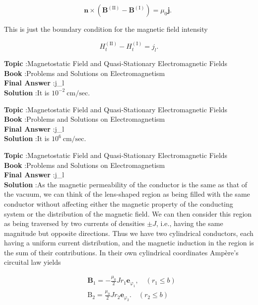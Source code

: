 \documentclass[10pt]{article}
\begin{document}
$$
\mathbf{n} \times\left(\mathbf{B}^{(\mathrm{II})}-\mathbf{B}^{(\mathrm{I})}\right)=\mu_{0} \mathbf{j} \text {. }
$$

This is just the boundary condition for the magnetic field intensity

$$
H_{t}^{(\mathrm{II})}-H_{t}^{(\mathrm{I})}=j_{l} .
$$

\textbf{Topic} :Magnetostatic Field and Quasi-Stationary Electromagnetic Fields\\
\textbf{Book} :Problems and Solutions on Electromagnetism\\
\textbf{Final Answer} :j_{l}\\


\textbf{Solution} :It is $10^{-2} \mathrm{~cm} / \mathrm{sec}$.

\textbf{Topic} :Magnetostatic Field and Quasi-Stationary Electromagnetic Fields\\
\textbf{Book} :Problems and Solutions on Electromagnetism\\
\textbf{Final Answer} :j_{l}\\


\textbf{Solution} :It is $10^{6} \mathrm{~cm} / \mathrm{sec}$.

\textbf{Topic} :Magnetostatic Field and Quasi-Stationary Electromagnetic Fields\\
\textbf{Book} :Problems and Solutions on Electromagnetism\\
\textbf{Final Answer} :j_{l}\\


\textbf{Solution} :As the magnetic permeability of the conductor is the same as that of the vacuum, we can think of the lens-shaped region as being filled with the same conductor without affecting either the magnetic property of the conducting system or the distribution of the magnetic field. We can then consider this region as being traversed by two currents of densities $\pm J$, i.e., having the same magnitude but opposite directions. Thus we have two cylindrical conductors, each having a uniform current distribution, and the magnetic induction in the region is the sum of their contributions. In their own cylindrical coordinates Ampère's circuital law yields

$$
\begin{aligned}
& \mathbf{B}_{1}=-\frac{\mu_{0}}{2} J r_{1} \mathbf{e}_{\varphi_{1}}, \quad\left(r_{1} \leq b\right) \\
& \mathrm{B}_{2}=\frac{\mu_{0}}{2} J r_{2} \mathbf{e}_{\varphi_{2}} . \quad\left(r_{2} \leq b\right)
\end{aligned}
$$
\end{document}
